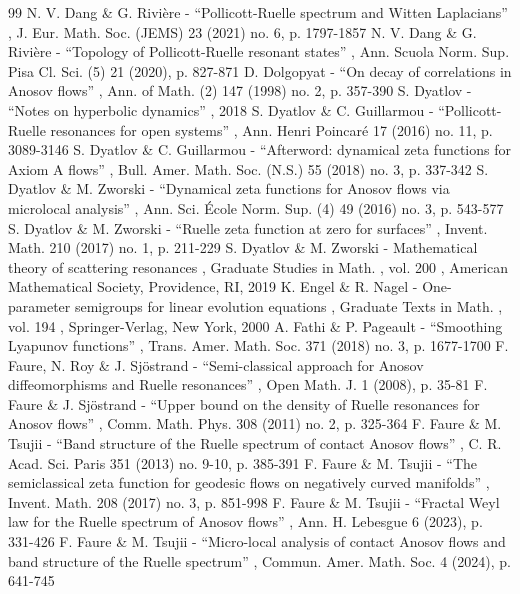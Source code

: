 \documentclass[11pt]{article}
\theoremstyle{definition}
\theoremstyle{plain}
\begin{document}
\begin{thebibliography}{99}
 N. V. Dang \& G. Rivière - “Pollicott-Ruelle spectrum and Witten Laplacians” , J. Eur. Math. Soc. (JEMS) 23 (2021) no. 6, p. 1797-1857
 N. V. Dang \& G. Rivière - “Topology of Pollicott-Ruelle resonant states” , Ann. Scuola Norm. Sup. Pisa Cl. Sci. (5) 21 (2020), p. 827-871
 D. Dolgopyat - “On decay of correlations in Anosov flows” , Ann. of Math. (2) 147 (1998) no. 2, p. 357-390
 S. Dyatlov - “Notes on hyperbolic dynamics” , 2018
 S. Dyatlov \& C. Guillarmou - “Pollicott-Ruelle resonances for open systems” , Ann. Henri Poincaré 17 (2016) no. 11, p. 3089-3146
 S. Dyatlov \& C. Guillarmou - “Afterword: dynamical zeta functions for Axiom A flows” , Bull. Amer. Math. Soc. (N.S.) 55 (2018) no. 3, p. 337-342
 S. Dyatlov \& M. Zworski - “Dynamical zeta functions for Anosov flows via microlocal analysis” , Ann. Sci. École Norm. Sup. (4) 49 (2016) no. 3, p. 543-577
 S. Dyatlov \& M. Zworski - “Ruelle zeta function at zero for surfaces” , Invent. Math. 210 (2017) no. 1, p. 211-229
 S. Dyatlov \& M. Zworski - Mathematical theory of scattering resonances , Graduate Studies in Math. , vol. 200 , American Mathematical Society, Providence, RI, 2019
 K. Engel \& R. Nagel - One-parameter semigroups for linear evolution equations , Graduate Texts in Math. , vol. 194 , Springer-Verlag, New York, 2000
 A. Fathi \& P. Pageault - “Smoothing Lyapunov functions” , Trans. Amer. Math. Soc. 371 (2018) no. 3, p. 1677-1700
 F. Faure, N. Roy \& J. Sjöstrand - “Semi-classical approach for Anosov diffeomorphisms and Ruelle resonances” , Open Math. J. 1 (2008), p. 35-81
 F. Faure \& J. Sjöstrand - “Upper bound on the density of Ruelle resonances for Anosov flows” , Comm. Math. Phys. 308 (2011) no. 2, p. 325-364
 F. Faure \& M. Tsujii - “Band structure of the Ruelle spectrum of contact Anosov flows” , C. R. Acad. Sci. Paris 351 (2013) no. 9-10, p. 385-391
 F. Faure \& M. Tsujii - “The semiclassical zeta function for geodesic flows on negatively curved manifolds” , Invent. Math. 208 (2017) no. 3, p. 851-998
 F. Faure \& M. Tsujii - “Fractal Weyl law for the Ruelle spectrum of Anosov flows” , Ann. H. Lebesgue 6 (2023), p. 331-426
 F. Faure \& M. Tsujii - “Micro-local analysis of contact Anosov flows and band structure of the Ruelle spectrum” , Commun. Amer. Math. Soc. 4 (2024), p. 641-745

\end{thebibliography}
\end{document}

